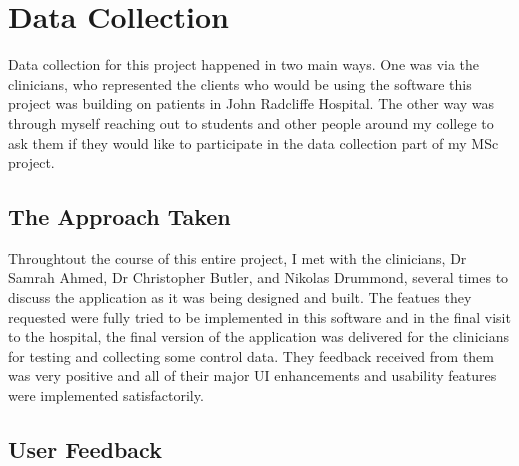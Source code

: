 \chapter{Data Collection}

\label{Chapter7_dataCollection} 

\begin{comment}
-------------------------------------------------
7. Data Collection
	a. The Approach Taken
	b. User Feedback
-------------------------------------------------
\end{comment}

Data collection for this project happened in two main ways. One was via the clinicians, who represented the clients who would be using the software this project was building on patients in John Radcliffe Hospital. The other way was through myself reaching out to students and other people around my college to ask them if they would like to participate in the data collection part of my MSc project.  


\section{The Approach Taken}
Throughtout the course of this entire project, I met with the clinicians, Dr Samrah Ahmed, Dr Christopher Butler, and Nikolas Drummond, several times to discuss the application as it was being designed and built. The featues they requested were fully tried to be implemented in this software and in the final visit to the hospital, the final version of the application was delivered for the clinicians for testing and collecting some control data. They feedback received from them was very positive and all of their major UI enhancements and usability features were implemented satisfactorily. 





\section{User Feedback}



